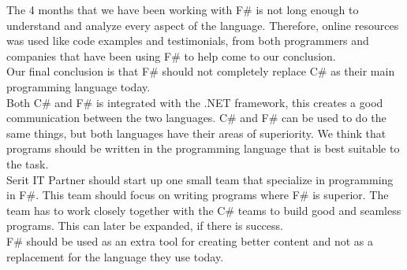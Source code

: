 \documentclass[12pt, a4paper]{article}
\begin{document}
The 4 months that we have been working with F\# is not long enough to understand and analyze every aspect of the language. Therefore, online resources was used like code examples and testimonials, from both programmers and companies that have been using F\# to help come to our conclusion.\\

Our final conclusion is that F\# should not completely replace C\# as their main programming language today.\\  

Both C\# and F\# is integrated with the .NET framework, this creates a good communication between the two languages. C\# and F\# can be used to do the same things, but both languages have their areas of superiority. We think that programs should be written in the programming language that is best suitable to the task.\\

Serit IT Partner should start up one small team that specialize in programming in F\#. This team should focus on writing programs where F\# is superior. The team has to work closely together with the C\# teams to build good and seamless programs. This can later be expanded, if there is success.\\

F\# should be used as an extra tool for creating better content and not as a replacement for the language they use today. 

\newpage


\end{document}
